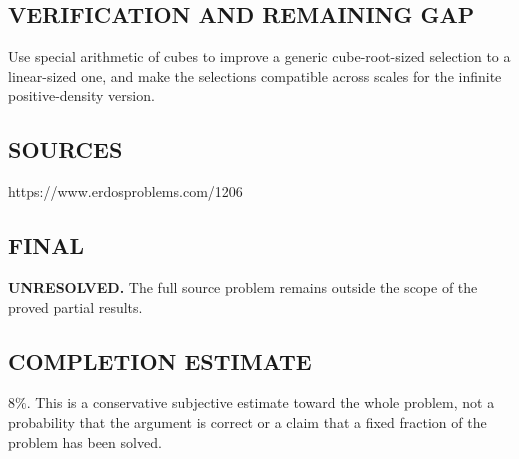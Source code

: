 \subsection*{VERIFICATION AND REMAINING GAP}
Use special arithmetic of cubes to improve a generic cube-root-sized
selection to a linear-sized one, and make the selections compatible across
scales for the infinite positive-density version.

\subsection*{SOURCES}
https://www.erdosproblems.com/1206

\subsection*{FINAL}
\textbf{UNRESOLVED.} The full source problem remains outside the scope of the proved partial results.

\subsection*{COMPLETION ESTIMATE}
$8\%$. This is a conservative subjective estimate toward the whole problem, not a probability that the argument is correct or a claim that a fixed fraction of the problem has been solved.
